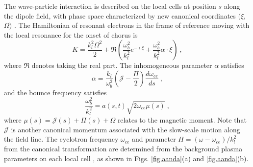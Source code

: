 The wave-particle interaction is described on the local cells 
at position $s$ along the dipole field, with phase space characterized by new canonical coordinates $(\xi$, $\Omega)$
\cite{zheng2024}.
The Hamiltonian of resonant electrons in the frame of reference moving with the local resonance for the onset of chorus is 
\cite{zheng2024}
\begin{equation}\label{eq.H_lab}
    K = \frac{k_l^2\Omega^2}{2} + {\Re}\left(\frac{\omega_b^2}{k_l^2} e^{-\imath \xi} + \frac{\omega_b^2}{k_l^2}\alpha \cdot \xi \right)~,
\end{equation}
where ${\Re}$ denotes taking the real part.
The inhomogeneous parameter $\alpha$ satisfies
\begin{equation}\label{eq.alpold}
   \alpha  = \frac{k_l}{\omega_b^2}(\mathcal{J} - \frac{\Pi}{2}) \frac{d\omega_{ce}}{ds}~,
\end{equation}
and the bounce frequency satisfies
\begin{equation}
    \frac{\omega_b^2}{k_l^2} =  a(s,t) \sqrt{2\omega_{ce}\mu(s)}~,
\end{equation}
where $\mu(s) = \mathcal{J}(s)+\Pi(s)+\Omega$
relates to 
the magnetic moment.
Note that $\mathcal{J}$ is another canonical momentum associated with the slow-scale motion along the field line. The cyclotron frequency $\omega_{ce}$
and parameter $\Pi = (\omega - \omega_{ce})/k_l^2$ from the canonical transformation  are determined from the background plasma parameters on each local cell \cite{zheng2024,zheng2023b}, 
as shown in Figs. \ref{fig.aanda}(a) and \ref{fig.aanda}(b).
